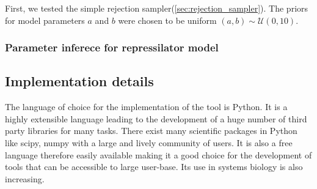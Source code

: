 \documentclass[12pt,a4paper,titlepage]{article}
\begin{document}
First, we tested the simple rejection sampler(\ref{sec:rejection_sampler}). The priors for model parameters $a$ and $b$ were chosen to be uniform $(a,b) \sim \mathcal{U}(0, 10)$.
\subsubsection{Parameter inferece for repressilator model}
\subsection{Implementation details}
The language of choice for the implementation of the tool is Python. It is a highly extensible language leading to the development of a huge number of third party libraries for many tasks. There exist many scientific packages in Python like scipy\cite{scipy}, numpy with a large and lively community of users. It is also a free language therefore easily available making it a good choice for the development of tools that can be accessible to large user-base. Its use in systems biology is also increasing\cite{myers2007python, olivier2002modelling}.




\end{document}
